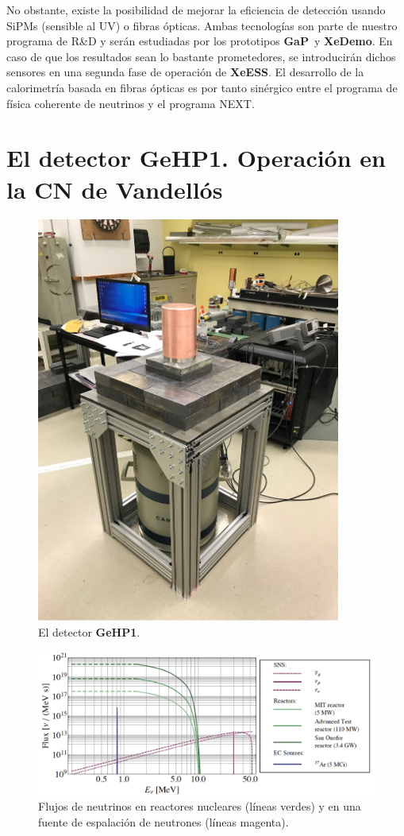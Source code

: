 \documentclass[12pt,a4paper,article]{report} %
\def\xess{{\bf XeESS}}
\def\xed{{\bf XeDemo}}
\def\ged{{\bf GeHP1}}
\def\gap{{\bf GaP}}
\begin{document}
No obstante, existe la posibilidad de mejorar la eficiencia de detección usando SiPMs (sensible al UV) o  fibras ópticas. Ambas tecnologías son parte de nuestro programa de R\&D y serán estudiadas por los prototipos \gap\ y \xed. En caso de que los resultados sean lo bastante prometedores, se introducirán dichos sensores en una segunda fase de operación de \xess. El desarrollo de la calorimetría basada en fibras ópticas es por tanto sinérgico entre el programa de física coherente de neutrinos y el programa NEXT. 


\section*{El detector \ged. Operación en la CN de Vandellós}

\begin{figure}[bht!]
\begin{center}
\includegraphics[width=10cm]{img/hdge.png}
\caption{El detector \ged.}
\label{fig:crysp}
\end{center}
\end{figure}

\begin{figure}[ht!]
\begin{center}
\includegraphics[width=12cm]{img/nuflux.png}
\caption{Flujos de neutrinos en reactores nucleares (líneas verdes) y en una fuente de espalación de neutrones (líneas magenta). }
\label{fig:nuflux}
\end{center}
\end{figure}
\end{document}

